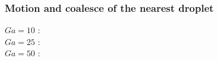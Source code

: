 \documentclass{sintefbeamer}
\begin{document}
\begin{frame}
  \frametitle{Motion and coalesce of the nearest droplet}
\centering
{}
  
  $Ga = 10$ :
  \href{file:///work/fintzin/BUBLLES_PROJECT/movies/First_anim.mp4}{}\\
  $Ga = 25$ :
  \href{file:///work/fintzin/BUBLLES_PROJECT/results/HOMOGENEOUS/Dim_3/N_5/PHI_0.1/rho_r_1.11/Bo_1/mu_r_0.1/Ga_25/animation_N1.mp4}{}\\
  $Ga = 50$ :
  \href{file:///work/fintzin/BUBLLES_PROJECT/results/HOMOGENEOUS/Dim_3/N_5/PHI_0.1/rho_r_1.11/Bo_1/mu_r_0.1/Ga_50/animation_N1.mp4}{}
\end{frame}
\end{document}
